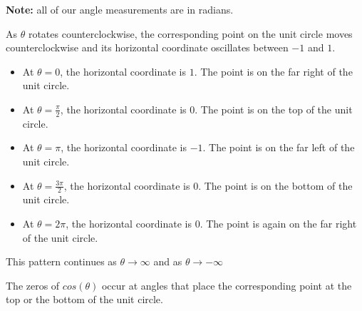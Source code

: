 \documentclass{ximera}
\begin{document}
\textbf{Note:}  all of our angle measurements are in radians.





\begin{image}
\end{image}



As $\theta$ rotates counterclockwise, the corresponding point on the unit circle moves counterclockwise and its horizontal coordinate oscillates between $-1$ and $1$.

\begin{itemize}
\item At $\theta = 0$, the horizontal coordinate is $1$. The point is on the far right of the unit circle.
\item At $\theta = \frac{\pi}{2}$, the horizontal coordinate is $0$. The point is on the top of the unit circle.
\item At $\theta = \pi$, the horizontal coordinate is $-1$. The point is on the far left of the unit circle.
\item At $\theta = \frac{3\pi}{2}$, the horizontal coordinate is $0$. The point is on the bottom of the unit circle.
\item At $\theta = 2\pi$, the horizontal coordinate is $0$. The point is again on the far right of the unit circle.
\end{itemize}


This pattern continues as $\theta \rightarrow \infty$ and as $\theta \rightarrow -\infty$

The zeros of $cos(\theta)$ occur at angles that place the corresponding point at the top or the bottom of the unit circle.  
\end{document}
